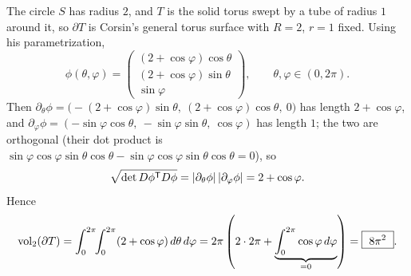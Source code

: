 \begin{exercisesolution}
\label{sol:torus_surface_area}
The circle $S$ has radius $2$, and $T$ is the solid torus swept by a tube of radius $1$
around it, so $\partial T$ is Corsin's general torus surface with $R=2$, $r=1$ fixed. Using
his parametrization,
\[\phi(\theta,\varphi) = \begin{pmatrix}(2+\cos\varphi)\cos\theta\\
  (2+\cos\varphi)\sin\theta\\ \sin\varphi\end{pmatrix}, \qquad \theta,\varphi\in(0,2\pi).\]
Then $\partial_\theta\phi = \big(-(2+\cos\varphi)\sin\theta,\ (2+\cos\varphi)\cos\theta,\
0\big)$ has length $2+\cos\varphi$, and $\partial_\varphi\phi = (-\sin\varphi\cos\theta,\
-\sin\varphi\sin\theta,\ \cos\varphi)$ has length $1$; the two are orthogonal (their dot
product is $\sin\varphi\cos\varphi\sin\theta\cos\theta - \sin\varphi\cos\varphi\sin\theta
\cos\theta = 0$), so
\[\sqrt{\det D\phi^{\mathsf{T}} D\phi} = \lvert\partial_\theta\phi\rvert\,\lvert\partial_\varphi\phi
  \rvert = 2+\cos\varphi.\]
Hence
\[\operatorname{vol}_2(\partial T) = \int_0^{2\pi}\!\!\int_0^{2\pi} (2+\cos\varphi)\,d\theta\,d\varphi
  = 2\pi\left(2\cdot2\pi + \underbrace{\int_0^{2\pi}\cos\varphi\,d\varphi}_{=0}\right)
  = \boxed{\ 8\pi^2\ }.\]
\end{exercisesolution}

